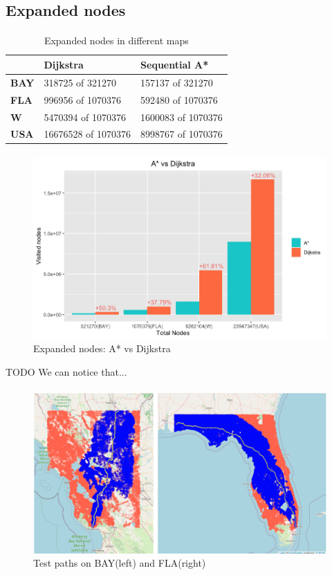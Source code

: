 \documentclass[12pt]{beamer}
\begin{document}
	\subsection{Expanded nodes}
	\begin{frame}{\secname}
		\framesubtitle{\subsecname}
		\begin{table}[ht!]
			\caption{Expanded nodes in different maps}
			\begin{tabular}{|l|l|l|}
			\hline
			\textbf{} & \textbf{Dijkstra} & \textbf{Sequential A*}       \\ \hline
			\textbf{BAY}            & 318725 of 321270    & 157137 of 321270  \\ \hline
			\textbf{FLA}            & 996956 of 1070376   & 592480 of 1070376 \\ \hline
			\textbf{W}              & 5470394 of 1070376  & 1600083 of 1070376 \\ \hline
			\textbf{USA}            & 16676528 of 1070376 & 8998767 of 1070376 \\ \hline
			\end{tabular}
		\end{table}
	\end{frame}
	\begin{frame}{\secname}
		\framesubtitle{\subsecname}
		\begin{figure}[ht!]
			\centering
			\includegraphics[width=0.8\linewidth]{astar_dijkstra/expanded_nodes.png}
			\caption{Expanded nodes: A* vs Dijkstra}
			\label{histogramnodes}
		\end{figure}
		TODO We can notice that...
	\end{frame}
	\begin{frame}{\secname}
		\framesubtitle{\subsecname}
		\begin{figure}[ht!]
			\centering
			\includegraphics[width=0.8\linewidth]{astar_dijkstra/dijkstra_astar.png}
			\caption{Test paths on BAY(left) and FLA(right)}
			\label{astardijkstra}
		\end{figure}
	\end{frame}
\end{document}
